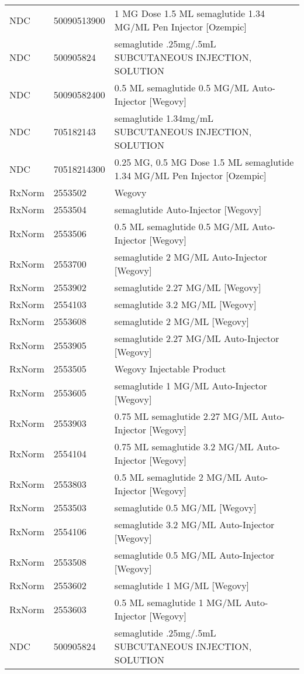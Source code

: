 \begin{longtable}{p{}p{}p{}}
  NDC & 50090513900 & 1 MG Dose 1.5 ML semaglutide 1.34 MG/ML Pen Injector [Ozempic] \\ 
  NDC & 500905824 & semaglutide .25mg/.5mL SUBCUTANEOUS INJECTION, SOLUTION \\ 
  NDC & 50090582400 & 0.5 ML semaglutide 0.5 MG/ML Auto-Injector [Wegovy] \\ 
  NDC & 705182143 & semaglutide 1.34mg/mL SUBCUTANEOUS INJECTION, SOLUTION \\ 
  NDC & 70518214300 & 0.25 MG, 0.5 MG Dose 1.5 ML semaglutide 1.34 MG/ML Pen Injector [Ozempic] \\ 
  RxNorm & 2553502 & Wegovy \\ 
  RxNorm & 2553504 & semaglutide Auto-Injector [Wegovy] \\ 
  RxNorm & 2553506 & 0.5 ML semaglutide 0.5 MG/ML Auto-Injector [Wegovy] \\ 
  RxNorm & 2553700 & semaglutide 2 MG/ML Auto-Injector [Wegovy] \\ 
  RxNorm & 2553902 & semaglutide 2.27 MG/ML [Wegovy] \\ 
  RxNorm & 2554103 & semaglutide 3.2 MG/ML [Wegovy] \\ 
  RxNorm & 2553608 & semaglutide 2 MG/ML [Wegovy] \\ 
  RxNorm & 2553905 & semaglutide 2.27 MG/ML Auto-Injector [Wegovy] \\ 
  RxNorm & 2553505 & Wegovy Injectable Product \\ 
  RxNorm & 2553605 & semaglutide 1 MG/ML Auto-Injector [Wegovy] \\ 
  RxNorm & 2553903 & 0.75 ML semaglutide 2.27 MG/ML Auto-Injector [Wegovy] \\ 
  RxNorm & 2554104 & 0.75 ML semaglutide 3.2 MG/ML Auto-Injector [Wegovy] \\ 
  RxNorm & 2553803 & 0.5 ML semaglutide 2 MG/ML Auto-Injector [Wegovy] \\ 
  RxNorm & 2553503 & semaglutide 0.5 MG/ML [Wegovy] \\ 
  RxNorm & 2554106 & semaglutide 3.2 MG/ML Auto-Injector [Wegovy] \\ 
  RxNorm & 2553508 & semaglutide 0.5 MG/ML Auto-Injector [Wegovy] \\ 
  RxNorm & 2553602 & semaglutide 1 MG/ML [Wegovy] \\ 
  RxNorm & 2553603 & 0.5 ML semaglutide 1 MG/ML Auto-Injector [Wegovy] \\ 
  NDC & 500905824 & semaglutide .25mg/.5mL SUBCUTANEOUS INJECTION, SOLUTION \\ 

\end{longtable}
